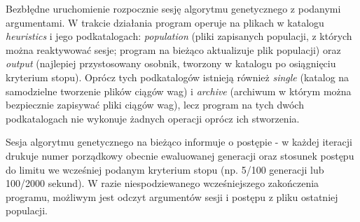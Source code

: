 Bezbłędne uruchomienie rozpocznie sesję algorytmu genetycznego z podanymi argumentami. W trakcie działania program operuje na plikach w katalogu \textit{heuristics} i jego podkatalogach: \textit{population} (pliki zapisanych populacji, z których można reaktywować sesje; program na bieżąco aktualizuje plik populacji) oraz \textit{output} (najlepiej przystosowany osobnik, tworzony w katalogu po osiągnięciu kryterium stopu). Oprócz tych podkatalogów istnieją również \textit{single} (katalog na samodzielne tworzenie plików ciągów wag) i \textit{archive} (archiwum w którym można bezpiecznie zapisywać pliki ciągów wag), lecz program na tych dwóch podkatalogach nie wykonuje żadnych operacji oprócz ich stworzenia.

Sesja algorytmu genetycznego na bieżąco informuje o postępie - w każdej iteracji drukuje numer porządkowy obecnie ewaluowanej generacji oraz stosunek postępu do limitu we wcześniej podanym kryterium stopu (np. 5/100 generacji lub 100/2000 sekund). W razie niespodziewanego wcześniejszego zakończenia programu, możliwym jest odczyt argumentów sesji i postępu z pliku ostatniej populacji.




